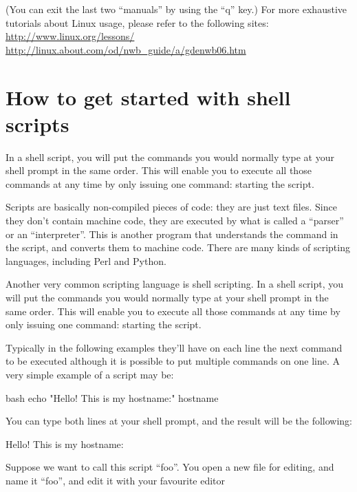 \begin{prompt}
\end{prompt}

(You can exit the last two ``manuals'' by using the ``q'' key.)
For more exhaustive tutorials about Linux usage, please refer to the following sites:
\url{http://www.linux.org/lessons/}
\url{http://linux.about.com/od/nwb\_guide/a/gdenwb06.htm}

\section{How to get started with shell scripts}

In a shell script, you will put the commands you would normally type at your
shell prompt in the same order. This will enable you to execute all those
commands at any time by only issuing one command: starting the script.

Scripts are basically non-compiled pieces of code: they are just text files.
Since they don't contain machine code, they are executed by what is called a
``parser'' or an ``interpreter''. This is another program that understands the
command in the script, and converts them to machine code. There are many kinds
of scripting languages, including Perl and Python.

Another very common scripting language is shell scripting. In a shell script,
you will put the commands you would normally type at your shell prompt in the
same order. This will enable you to execute all those commands at any time by
only issuing one command: starting the script.

Typically in the following examples they'll have on each line the next command
to be executed although it is possible to put multiple commands on one line. A
very simple example of a script may be:

\begin{code}{bash}
echo "Hello! This is my hostname:"
hostname
\end{code}

You can type both lines at your shell prompt, and the result will be the following:
\begin{prompt}
Hello! This is my hostname:
\end{prompt}

Suppose we want to call this script ``foo''. You open a new file for editing, and
name it ``foo'', and edit it with your favourite editor

